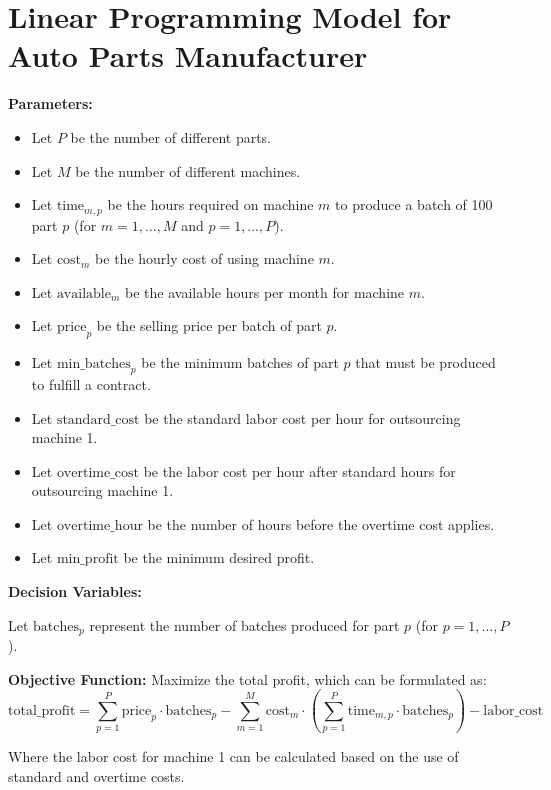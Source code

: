 \documentclass{article}
\begin{document}
\section*{Linear Programming Model for Auto Parts Manufacturer}

\textbf{Parameters:}

\begin{itemize}
    \item Let \( P \) be the number of different parts.
    \item Let \( M \) be the number of different machines.
    \item Let \( \text{time}_{m,p} \) be the hours required on machine \( m \) to produce a batch of 100 part \( p \) (for \( m = 1, \ldots, M \) and \( p = 1, \ldots, P \)).
    \item Let \( \text{cost}_{m} \) be the hourly cost of using machine \( m \).
    \item Let \( \text{available}_{m} \) be the available hours per month for machine \( m \).
    \item Let \( \text{price}_{p} \) be the selling price per batch of part \( p \).
    \item Let \( \text{min\_batches}_{p} \) be the minimum batches of part \( p \) that must be produced to fulfill a contract.
    \item Let \( \text{standard\_cost} \) be the standard labor cost per hour for outsourcing machine 1.
    \item Let \( \text{overtime\_cost} \) be the labor cost per hour after standard hours for outsourcing machine 1.
    \item Let \( \text{overtime\_hour} \) be the number of hours before the overtime cost applies.
    \item Let \( \text{min\_profit} \) be the minimum desired profit.
\end{itemize}

\textbf{Decision Variables:}

Let \( \text{batches}_{p} \) represent the number of batches produced for part \( p \) (for \( p = 1, \ldots, P \)).

\textbf{Objective Function:}
Maximize the total profit, which can be formulated as:
\[
\text{total\_profit} = \sum_{p=1}^{P} \text{price}_{p} \cdot \text{batches}_{p} - \sum_{m=1}^{M} \text{cost}_{m} \cdot \left( \sum_{p=1}^{P} \text{time}_{m,p} \cdot \text{batches}_{p} \right) - \text{labor\_cost}
\]

Where the labor cost for machine 1 can be calculated based on the use of standard and overtime costs.
\end{document}
